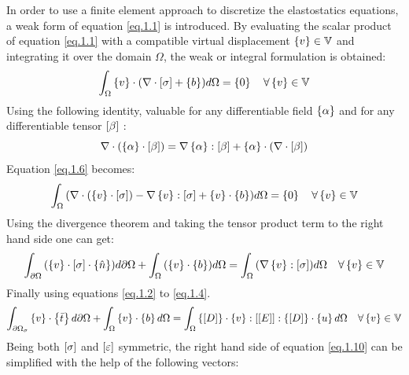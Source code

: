 In order to use a finite element approach to discretize the elastostatics equations, a weak form of equation \eqref{eq.1.1} is introduced.
By evaluating the scalar product of equation \eqref{eq.1.1} with a compatible virtual displacement $ \left\lbrace{v}\right \rbrace \in \mathbb{V}$ and integrating it over the domain $\Omega$, the weak or integral formulation is obtained:
\begin{eqnarray}
\label{eq.1.6}
\int_{\Omega}{\left\lbrace{v}\right \rbrace \cdot (\nabla \cdot \left[{\sigma}\right] + \left\lbrace{b}\right \rbrace) d\Omega}=\left\lbrace{0}\right \rbrace \quad \forall \left\lbrace{v}\right \rbrace \in \mathbb{V} 
\end{eqnarray}
Using the following identity, valuable for any differentiable field $\left\lbrace{\alpha}\right \rbrace$ and for any differentiable tensor $ \left[{\beta}\right]$ :
\begin{equation}
\label{eq.1.7}
\nabla \cdot (\left\lbrace{\alpha}\right \rbrace \cdot \left[{\beta}\right])=\nabla \left\lbrace{\alpha}\right \rbrace : \left[{\beta}\right]+\left\lbrace{\alpha}\right \rbrace\cdot(\nabla \cdot \left[{\beta}\right])
\end{equation}
Equation \eqref{eq.1.6}  becomes:
\begin{eqnarray}
\label{eq.1.8}
\int_{\Omega}{(\nabla \cdot (\left\lbrace{v}\right \rbrace \cdot \left[{\sigma}\right]) - \nabla \left\lbrace{v}\right \rbrace :\left[{\sigma}\right]  + \left\lbrace{v}\right \rbrace \cdot \left\lbrace{b}\right \rbrace) d\Omega}=\left\lbrace{0}\right \rbrace \quad \forall \left\lbrace{v}\right \rbrace \in \mathbb{V} 
\end{eqnarray}
Using the divergence theorem and taking the tensor product term to the right hand side one can get:
\begin{eqnarray}
\label{eq.1.9}
\int_{\partial \Omega}{(\left\lbrace{v}\right \rbrace \cdot \left[{\sigma}\right]\cdot\left\lbrace{\hat{n}}\right \rbrace )d\partial \Omega}+\int_{\Omega}{(\left\lbrace{v}\right \rbrace \cdot \left\lbrace{b}\right \rbrace) d\Omega}=\int_{\Omega}{(\nabla \left\lbrace{v}\right \rbrace :\left[{\sigma}\right]) d\Omega} \quad \forall \left\lbrace{v}\right \rbrace \in \mathbb{V} 
\end{eqnarray}
Finally using equations \eqref{eq.1.2} to \eqref{eq.1.4}.
\begin{eqnarray}
\label{eq.1.10}
\int_{\partial \Omega_{\sigma}}{\left\lbrace{v}\right \rbrace \cdot \left\lbrace{\bar{t}}\right \rbrace d\partial \Omega}+\int_{\Omega}{\left\lbrace{v}\right \rbrace \cdot \left\lbrace{b}\right \rbrace d\Omega}=\int_{\Omega}{\left\lbrace{\ensuremath\left[{D}\right]}\right \rbrace\cdot \left\lbrace{v}\right \rbrace :\left[{\left[{E}\right]}\right]:\left\lbrace{\ensuremath\left[{D}\right]}\right \rbrace\cdot \left\lbrace{u}\right \rbrace  d\Omega} \quad \forall \left\lbrace{v}\right \rbrace \in \mathbb{V}
\end{eqnarray}
Being both $\left[{\sigma}\right]$ and $\left[{ 	\varepsilon}\right]$ symmetric, the right hand side of equation \eqref{eq.1.10} can be simplified with the help of the following vectors:
